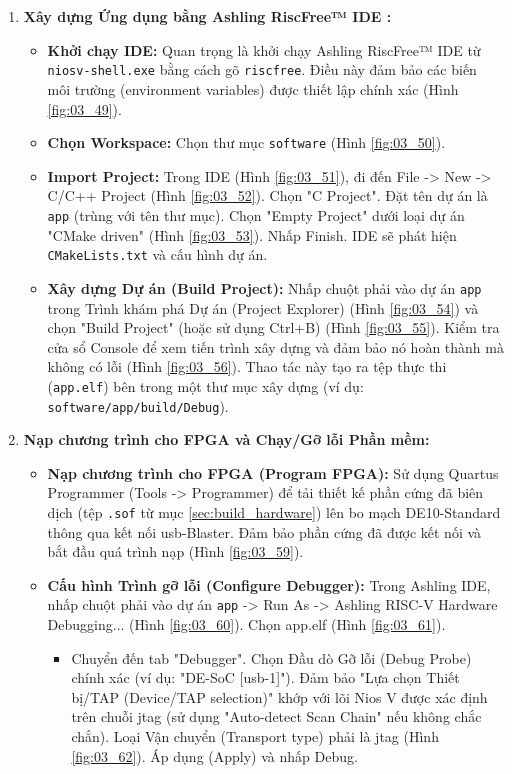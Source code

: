 \begin{enumerate}
\begin{itemize}
    \end{itemize}
    \item \textbf{Xây dựng Ứng dụng bằng Ashling RiscFree™ IDE \cite{ashling_riscfree_guide}:}
    \begin{itemize}
        \item \textbf{Khởi chạy IDE:} Quan trọng là khởi chạy Ashling RiscFree™ IDE từ \texttt{ niosv-shell.exe} bằng cách gõ \texttt{riscfree}. Điều này đảm bảo các biến môi trường (environment variables) được thiết lập chính xác (Hình \ref{fig:03_49}).
        \item \textbf{Chọn Workspace:} Chọn thư mục \texttt{software} (Hình \ref{fig:03_50}).
        \item \textbf{Import Project:} Trong IDE (Hình \ref{fig:03_51}), đi đến File -> New -> C/C++ Project (Hình \ref{fig:03_52}). Chọn "C Project". Đặt tên dự án là \texttt{app} (trùng với tên thư mục). Chọn "Empty Project" dưới loại dự án "CMake driven" (Hình \ref{fig:03_53}). Nhấp Finish. IDE sẽ phát hiện \texttt{CMakeLists.txt} và cấu hình dự án.
        \item \textbf{Xây dựng Dự án (Build Project):} Nhấp chuột phải vào dự án \texttt{app} trong Trình khám phá Dự án (Project Explorer) (Hình \ref{fig:03_54}) và chọn "Build Project" (hoặc sử dụng Ctrl+B) (Hình \ref{fig:03_55}). Kiểm tra cửa sổ Console để xem tiến trình xây dựng và đảm bảo nó hoàn thành mà không có lỗi (Hình \ref{fig:03_56}). Thao tác này tạo ra tệp thực thi (\texttt{app.elf}) bên trong một thư mục xây dựng (ví dụ: \texttt{software/app/build/Debug}). 
    \end{itemize}
    \item \textbf{Nạp chương trình cho FPGA và Chạy/Gỡ lỗi Phần mềm:}
    \begin{itemize}
        \item \textbf{Nạp chương trình cho FPGA (Program FPGA):} Sử dụng Quartus Programmer (Tools -> Programmer) để tải thiết kế phần cứng đã biên dịch (tệp \texttt{.sof} từ mục \ref{sec:build_hardware}) lên bo mạch DE10-Standard thông qua kết nối \acrshort{usb}-Blaster. Đảm bảo phần cứng đã được kết nối và bắt đầu quá trình nạp (Hình \ref{fig:03_59}).
        \item \textbf{Cấu hình Trình gỡ lỗi (Configure Debugger):} Trong Ashling IDE, nhấp chuột phải vào dự án \texttt{app} -> Run As -> Ashling RISC-V Hardware Debugging... (Hình \ref{fig:03_60}). Chọn app.elf (Hình \ref{fig:03_61}).
        \begin{itemize}
            \item Chuyển đến tab "Debugger". Chọn Đầu dò Gỡ lỗi (Debug Probe) chính xác (ví dụ: "DE-SoC [\acrshort{usb}-1]"). Đảm bảo "Lựa chọn Thiết bị/TAP (Device/TAP selection)" khớp với lõi Nios V được xác định trên chuỗi \acrshort{jtag} (sử dụng "Auto-detect Scan Chain" nếu không chắc chắn). Loại Vận chuyển (Transport type) phải là \acrshort{jtag} (Hình \ref{fig:03_62}). Áp dụng (Apply) và nhấp Debug.

\end{itemize}
\end{itemize}
\end{enumerate}
